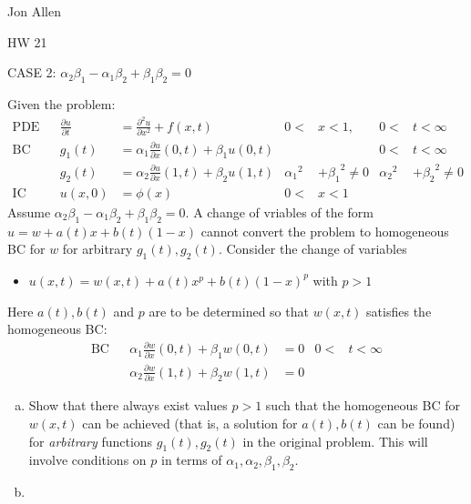 \documentclass{article}
\begin{document}
Jon Allen

HW 21

CASE 2: $\alpha_2\beta_1-\alpha_1\beta_2+\beta_1\beta_2=0$

Given the problem:
\begin{align*}
  \text{PDE}&&\frac{\partial u}{\partial t}&=\frac{\partial ^2u}{\partial x^2}+f(x,t)&0<&x<1,&0<&t<\infty\\
  \text{BC}&&g_1(t)&=\alpha_1\frac{\partial u}{\partial x}(0,t)+\beta_1u(0,t)&&&0<&t<\infty\\
  &&g_2(t)&=\alpha_2\frac{\partial u}{\partial x}(1,t)+\beta_2u(1,t)&{\alpha_1}^2&+{\beta_1}^2\ne0&{\alpha_2}^2&+{\beta_2}^2\ne0\\
  \text{IC}&&u(x,0)&=\phi(x)&0<&x<1
\end{align*}
Assume $\alpha_2\beta_1-\alpha_1\beta_2+\beta_1\beta_2=0$. A change of vriables of the form $u=w+a(t)x+b(t)(1-x)$ cannot convert the problem to homogeneous BC for $w$ for arbitrary $g_1(t),g_2(t)$. Consider the change of variables
\begin{itemize}
\item
$u(x,t)=w(x,t)+a(t)x^p+b(t)(1-x)^p$ with $p>1$
\end{itemize}
Here $a(t),b(t)$ and $p$ are to be determined so that $w(x,t)$ satisfies the homogeneous BC:
\begin{align*}
  \text{BC}&&\alpha_1\frac{\partial w}{\partial x}(0,t)+\beta_1w(0,t)&=0&0<&t<\infty\\
  &&\alpha_2\frac{\partial w}{\partial x}(1,t)+\beta_2w(1,t)&=0
\end{align*}
\begin{enumerate}[(a)]
\item
Show that there always exist values $p>1$ such that the homogeneous BC for $w(x,t)$ can be achieved (that is, a solution for $a(t),b(t)$ can be found) for \emph{arbitrary} functions $g_1(t),g_2(t)$ in the original problem. This will involve conditions on $p$ in terms of $\alpha_1,\alpha_2,\beta_1,\beta_2$.
\item

\end{enumerate}
\end{document}
